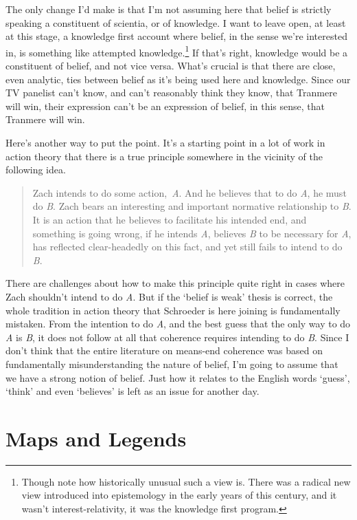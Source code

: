 \documentclass[
  11pt,
]{book}
\begin{document}
The only change I'd make is that I'm not assuming here that belief is strictly speaking a constituent of scientia, or of knowledge. I want to leave open, at least at this stage, a knowledge first account where belief, in the sense we're interested in, is something like attempted knowledge.\footnote{Though note how historically unusual such a view is. There was a radical new view introduced into epistemology in the early years of this century, and it wasn't interest-relativity, it was the knowledge first program.} If that's right, knowledge would be a constituent of belief, and not vice versa. What's crucial is that there are close, even analytic, ties between belief as it's being used here and knowledge. Since our TV panelist can't know, and can't reasonably think they know, that Tranmere will win, their expression can't be an expression of belief, in this sense, that Tranmere will win.

Here's another way to put the point. It's a starting point in a lot of work in action theory that there is a true principle somewhere in the vicinity of the following idea.

\begin{quote}
Zach intends to do some action,~\emph{A}. And he believes that to do \emph{A}, he must do \emph{B}. Zach bears an interesting and important normative relationship to \emph{B}. It is an action that he believes to facilitate his intended end, and something is going wrong, if he intends \emph{A}, believes \emph{B} to be necessary for \emph{A}, has reflected clear-headedly on this fact, and yet still fails to intend to do \emph{B}. \citep[ 223]{Schroeder2009}
\end{quote}

There are challenges about how to make this principle quite right in cases where Zach shouldn't intend to do \emph{A}. But if the `belief is weak' thesis is correct, the whole tradition in action theory that Schroeder is here joining is fundamentally mistaken. From the intention to do \emph{A}, and the best guess that the only way to do \emph{A} is \emph{B}, it does not follow at all that coherence requires intending to do \emph{B}. Since I don't think that the entire literature on means-end coherence was based on fundamentally misunderstanding the nature of belief, I'm going to assume that we have a strong notion of belief. Just how it relates to the English words `guess', `think' and even `believes' is left as an issue for another day.

\hypertarget{mapslegends}{%
\section{Maps and Legends}\label{mapslegends}}
\end{document}
